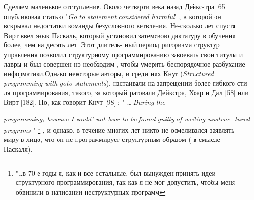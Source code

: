 \documentclass{mai_book}
\begin{document}
Сделаем маленькое отступление. Около четверти века назад Дейкс-\linebreak тра [65] опубликовал статью "\textit{Go to statement considered harmful}" , в \linebreak которой он вскрывал недостатки команды безусловного ветвления. Не-\linebreak сколько лет спустя Вирт ввел язык Паскаль, который установил затем\linebreak свою диктатуру в обучении более, чем на десять лет. Этот длитель- \linebreak ный период ригоризма структур управления позволил структурному \linebreak программированию завоевать свои титулы и лавры и был совершен-\linebreak но необходим , чтобы умерить беспорядочное разбухание информатики.\linebreak Однако некоторые авторы, и среди них Кнут (\textit{Structured programming \linebreak  with goto statements}), настаивали на запрещении более гибкого сти-\linebreak ля программирования, такого, за который ратовали Дейкстра, Хоар \linebreak и Дал [58]\: или\:\: Вирт [182]\:. Но,\: как\: говорит\:\: Кнут [98]\: :  " \dots$~$\textit{During\: the}

\pagebreak

\noindent\textit{programming, because I could' not bear to be found guilty of writing unstruc-\linebreak
tured programs }" \footnote[2]{"\dots в 70-е годы я, как и все остальные, был вынужден принять идеи структурного программирования, так как я не мог допустить, чтобы меня обвинили в написании неструктурных программ} , и однако, в течение многих лет никто не осмеливался заявлять миру в лицо, что он не программирует структурным образом ( в смысле Паскаля). 
\end{document}
